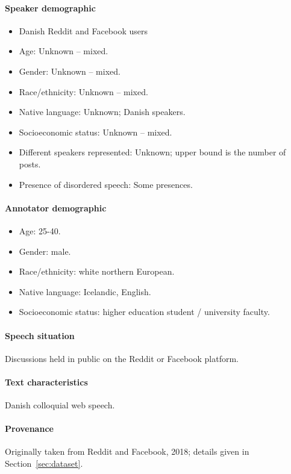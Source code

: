 \documentclass{article}
\begin{document}
\paragraph{Speaker demographic} 
\begin{itemize}
    \item Danish Reddit and Facebook users
    \item Age: Unknown -- mixed.
    \item Gender: Unknown -- mixed.
    \item Race/ethnicity: Unknown -- mixed.
    \item Native language: Unknown; Danish speakers.
    \item Socioeconomic status: Unknown -- mixed.
    \item Different speakers represented: Unknown; upper bound is the number of posts.
    \item Presence of disordered speech: Some presences.
\end{itemize}

\paragraph{Annotator demographic} 
\begin{itemize}
    \item Age: 25-40. 
    \item Gender: male. 
    \item Race/ethnicity: white northern European. 
    \item Native language: Icelandic, English. 
    \item Socioeconomic status: higher education student / university faculty.
\end{itemize}

\paragraph{Speech situation} Discussions held in public on the Reddit or Facebook platform.

\paragraph{Text characteristics} Danish colloquial web speech.

\paragraph{Provenance} Originally taken from Reddit and Facebook, 2018; details given in Section~\ref{sec:dataset}.
\end{document}
